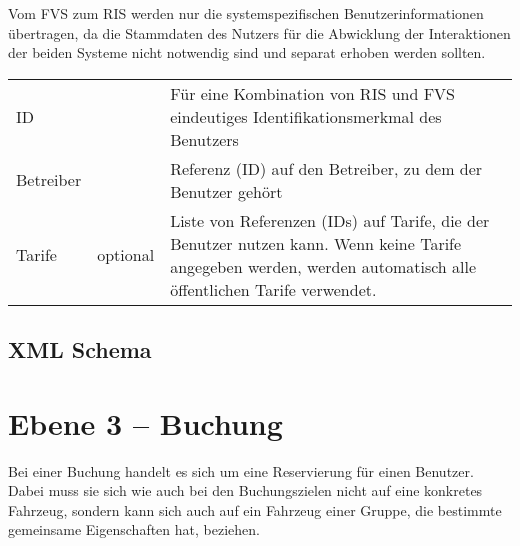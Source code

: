 Vom FVS zum RIS werden nur die systemspezifischen Benutzerinformationen übertragen, da die Stammdaten des Nutzers für die Abwicklung der Interaktionen der beiden Systeme nicht notwendig sind und separat erhoben werden sollten.

\begin{flushleft}
\begin{tabularx}{\linewidth}{l>{\raggedright\arraybackslash}l>{\raggedright\arraybackslash}X} 
\toprule
ID & & Für eine Kombination von RIS und FVS eindeutiges Identifikationsmerkmal des Benutzers \\
Betreiber & & Referenz (ID) auf den Betreiber, zu dem der Benutzer gehört \\
Tarife & optional & Liste von Referenzen (IDs) auf Tarife, die der Benutzer nutzen kann. Wenn keine Tarife angegeben werden, werden automatisch alle öffentlichen Tarife verwendet. \\
\bottomrule
\end{tabularx}
\end{flushleft}

\subsection{XML Schema}



\section{Ebene 3 -- Buchung}
Bei einer Buchung handelt es sich um eine Reservierung für einen Benutzer. Dabei muss sie sich wie auch bei den Buchungszielen nicht auf eine konkretes Fahrzeug, sondern kann sich auch auf ein Fahrzeug einer Gruppe, die bestimmte gemeinsame Eigenschaften hat, beziehen.

